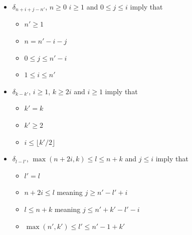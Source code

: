 \documentclass[a4paper]{amsart}
\begin{document}
\begin{itemize}
\item $\delta_{n+i+j-n'}$, $n\geq 0$ $i\geq 1$ and $0\leq j\leq i$ imply that
\begin{itemize}
\item $n'\geq 1$
\item $n = n'-i-j$
\item $0\leq j\leq n'-i$
\item $1\leq i\leq n'$
\end{itemize}
\item $\delta_{k-k'}$, $i\geq 1$, $k\geq 2i$ and $i\geq 1$ imply that
\begin{itemize}
\item $k'=k$
\item $k'\geq 2$
\item $i\leq \lfloor k'/2\rfloor$
\end{itemize}
\item $\delta_{l-l'}$, $\max(n+2i,k)\leq l\leq n+k$ and $j\leq i$ imply that
\begin{itemize}
\item $l'=l$
\item $n+2i\leq l$ meaning $j\geq n'-l'+ i$
\item $l\leq n+k$ meaning $j \leq n'+k'-l'-i$
\item $\max(n',k') \leq l' \leq n'-1+k'$
\end{itemize}
\end{itemize}
\end{document}
